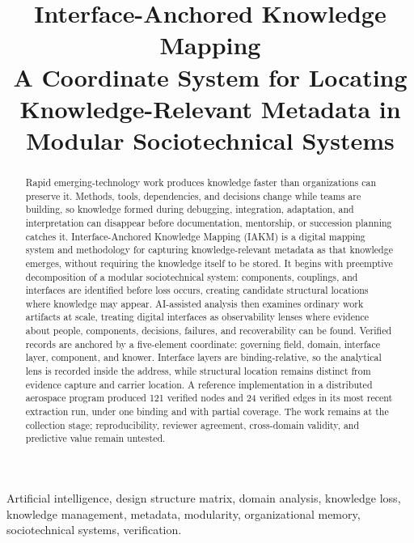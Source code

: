 \documentclass[conference]{IEEEtran}
\begin{document}
\title{Interface-Anchored Knowledge Mapping\\
{\large A Coordinate System for Locating Knowledge-Relevant Metadata in Modular Sociotechnical Systems}}

\author{
}

\maketitle

\begin{abstract}
Rapid emerging-technology work produces knowledge faster than organizations can preserve it. Methods, tools, dependencies, and decisions change while teams are building, so knowledge formed during debugging, integration, adaptation, and interpretation can disappear before documentation, mentorship, or succession planning catches it. Interface-Anchored Knowledge Mapping (IAKM) is a digital mapping system and methodology for capturing knowledge-relevant metadata as that knowledge emerges, without requiring the knowledge itself to be stored. It begins with preemptive decomposition of a modular sociotechnical system: components, couplings, and interfaces are identified before loss occurs, creating candidate structural locations where knowledge may appear. AI-assisted analysis then examines ordinary work artifacts at scale, treating digital interfaces as observability lenses where evidence about people, components, decisions, failures, and recoverability can be found. Verified records are anchored by a five-element coordinate: governing field, domain, interface layer, component, and knower. Interface layers are binding-relative, so the analytical lens is recorded inside the address, while structural location remains distinct from evidence capture and carrier location. A reference implementation in a distributed aerospace program produced 121 verified nodes and 24 verified edges in its most recent extraction run, under one binding and with partial coverage. The work remains at the collection stage; reproducibility, reviewer agreement, cross-domain validity, and predictive value remain untested.
\end{abstract}

\begin{IEEEkeywords}
Artificial intelligence, design structure matrix, domain analysis, knowledge loss, knowledge management, metadata, modularity, organizational memory, sociotechnical systems, verification.
\end{IEEEkeywords}
\end{document}
